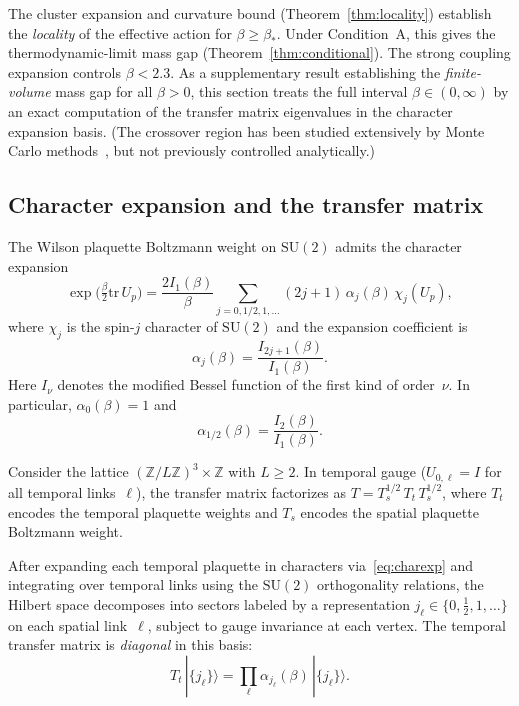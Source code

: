 \documentclass[11pt]{article}
\theoremstyle{definition}
\newcommand{\SU}{\mathrm{SU}}
\newcommand{\tr}{\mathrm{tr}}
\newcommand{\Z}{\mathbb{Z}}
\begin{document}
The cluster expansion and curvature bound
(Theorem~\ref{thm:locality}) establish the \emph{locality} of the
effective action for $\beta\ge\beta_*$.  Under Condition~A,
this gives the thermodynamic-limit mass gap
(Theorem~\ref{thm:conditional}).  The strong coupling expansion
controls $\beta<2.3$.  As a supplementary result establishing the
\emph{finite-volume} mass gap for all $\beta>0$, this section treats
the full interval $\beta\in(0,\infty)$
by an exact computation of the transfer matrix
eigenvalues in the character expansion basis.  (The crossover region
has been studied extensively by Monte Carlo methods~\cite{Creutz80},
but not previously controlled analytically.)

\subsection{Character expansion and the transfer matrix}

The Wilson plaquette Boltzmann weight on $\SU(2)$ admits the character
expansion
\begin{equation}\label{eq:charexp}
\exp\bigl(\tfrac{\beta}{2}\tr\,U_p\bigr)
=\frac{2I_1(\beta)}{\beta}\sum_{j=0,1/2,1,\ldots}(2j+1)\,\alpha_j(\beta)\,\chi_j(U_p),
\end{equation}
where $\chi_j$ is the spin-$j$ character of $\SU(2)$ and the expansion
coefficient is
\begin{equation}\label{eq:alpha}
\alpha_j(\beta)=\frac{I_{2j+1}(\beta)}{I_1(\beta)}.
\end{equation}
Here $I_\nu$ denotes the modified Bessel function of the first kind
of order~$\nu$.  In particular, $\alpha_0(\beta)=1$ and
\begin{equation}
\alpha_{1/2}(\beta)=\frac{I_2(\beta)}{I_1(\beta)}.
\end{equation}

Consider the lattice $(\Z/L\Z)^3\times\Z$ with $L\ge 2$.  In
temporal gauge ($U_{0,\ell}=I$ for all temporal links~$\ell$), the
transfer matrix factorizes as $T=T_s^{1/2}\,T_t\,T_s^{1/2}$, where
$T_t$ encodes the temporal plaquette weights and $T_s$ encodes the
spatial plaquette Boltzmann weight.

After expanding each temporal plaquette in characters
via~\eqref{eq:charexp} and integrating over temporal links using the
$\SU(2)$ orthogonality relations, the Hilbert space decomposes into
sectors labeled by a representation $j_\ell\in\{0,\frac{1}{2},1,\ldots\}$
on each spatial link~$\ell$, subject to gauge invariance at each
vertex.  The temporal transfer matrix is \emph{diagonal} in this basis:
\begin{equation}\label{eq:Tt}
T_t\,|\{j_\ell\}\rangle
=\prod_\ell\alpha_{j_\ell}(\beta)\,|\{j_\ell\}\rangle.
\end{equation}
\end{document}
